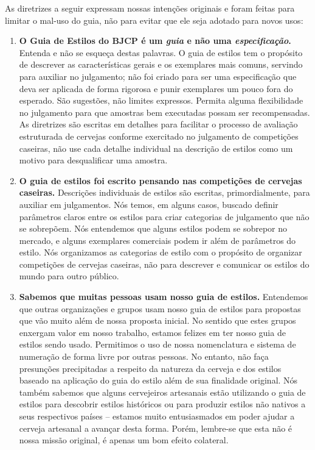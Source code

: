 As diretrizes a seguir expressam nossas intenções originais e foram feitas para limitar o mal-uso do guia, não para evitar que ele seja adotado para novos usos:
\begin{enumerate}
\item \textbf{O Guia de Estilos do BJCP é um \textit{guia} e não uma \textit{especificação}.} Entenda e não se esqueça destas palavras. O guia de estilos tem o propósito de descrever as características gerais e os exemplares mais comuns, servindo para auxiliar no julgamento; não foi criado para ser uma especificação que deva ser aplicada de forma rigorosa e punir exemplares um pouco fora do esperado. São sugestões, não limites expressos. Permita alguma flexibilidade no julgamento para que amostras bem executadas possam ser recompensadas. As diretrizes são escritas em detalhes para facilitar o processo de avaliação estruturada de cervejas conforme exercitado no julgamento de competições caseiras, não use cada detalhe individual na descrição de estilos como um motivo para desqualificar uma amostra.
\item \textbf{O guia de estilos foi escrito pensando nas competições de cervejas caseiras.} Descrições individuais de estilos são escritas, primordialmente, para auxiliar em julgamentos. Nós temos, em alguns casos, buscado definir parâmetros claros entre os estilos para criar categorias de julgamento que não se sobrepõem. Nós entendemos que alguns estilos podem se sobrepor no mercado, e alguns exemplares comerciais podem ir além de parâmetros do estilo. Nós organizamos as categorias de estilo com o propósito de organizar competições de cervejas caseiras, não para descrever e comunicar os estilos do mundo para outro público.
\item \textbf{Sabemos que muitas pessoas usam nosso guia de estilos.} Entendemos que outras organizações e grupos usam nosso guia de estilos para propostas que vão muito além de nossa proposta inicial. No sentido que estes grupos enxergam valor em nosso trabalho, estamos felizes em ter nosso guia de estilos sendo usado. Permitimos o uso de nossa nomenclatura e sistema de numeração de forma livre por outras pessoas. No entanto, não faça presunções precipitadas a respeito da natureza da cerveja e dos estilos baseado na aplicação do guia do estilo além de sua finalidade original. Nós também sabemos que alguns cervejeiros artesanais estão utilizando o guia de estilos para descobrir estilos históricos ou para produzir estilos não nativos a seus respectivos países – estamos muito entusiasmados em poder ajudar a cerveja artesanal a avançar desta forma. Porém, lembre-se que esta não é nossa missão original, é apenas um bom efeito colateral.

\end{enumerate}
